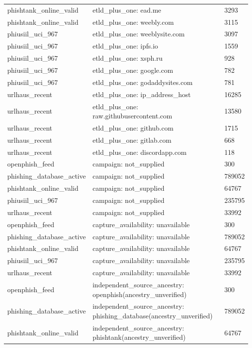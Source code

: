 \begin{tabular}{lll}
phishtank\_online\_valid & etld\_plus\_one: ead.me & 3293 \\
phishtank\_online\_valid & etld\_plus\_one: weebly.com & 3115 \\
phiusiil\_uci\_967 & etld\_plus\_one: weeblysite.com & 3097 \\
phiusiil\_uci\_967 & etld\_plus\_one: ipfs.io & 1559 \\
phiusiil\_uci\_967 & etld\_plus\_one: xsph.ru & 928 \\
phiusiil\_uci\_967 & etld\_plus\_one: google.com & 782 \\
phiusiil\_uci\_967 & etld\_plus\_one: godaddysites.com & 781 \\
urlhaus\_recent & etld\_plus\_one: ip\_address\_host & 16285 \\
urlhaus\_recent & etld\_plus\_one: raw.githubusercontent.com & 13580 \\
urlhaus\_recent & etld\_plus\_one: github.com & 1715 \\
urlhaus\_recent & etld\_plus\_one: gitlab.com & 668 \\
urlhaus\_recent & etld\_plus\_one: discordapp.com & 118 \\
openphish\_feed & campaign: not\_supplied & 300 \\
phishing\_database\_active & campaign: not\_supplied & 789052 \\
phishtank\_online\_valid & campaign: not\_supplied & 64767 \\
phiusiil\_uci\_967 & campaign: not\_supplied & 235795 \\
urlhaus\_recent & campaign: not\_supplied & 33992 \\
openphish\_feed & capture\_availability: unavailable & 300 \\
phishing\_database\_active & capture\_availability: unavailable & 789052 \\
phishtank\_online\_valid & capture\_availability: unavailable & 64767 \\
phiusiil\_uci\_967 & capture\_availability: unavailable & 235795 \\
urlhaus\_recent & capture\_availability: unavailable & 33992 \\
openphish\_feed & independent\_source\_ancestry: openphish(ancestry\_unverified) & 300 \\
phishing\_database\_active & independent\_source\_ancestry: phishing\_database(ancestry\_unverified) & 789052 \\
phishtank\_online\_valid & independent\_source\_ancestry: phishtank(ancestry\_unverified) & 64767 \\

\end{tabular}
